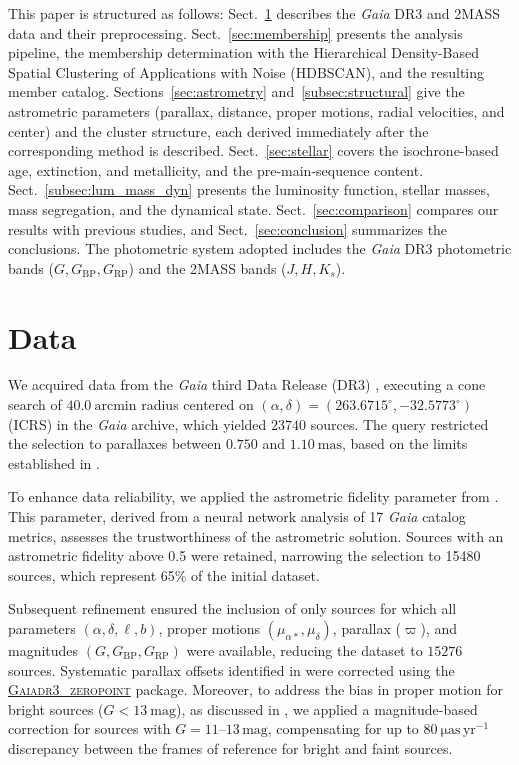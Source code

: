 \documentclass{aa}
\begin{document}
This paper is structured as follows: Sect.~\ref{sec:data} describes the \textit{Gaia} DR3 and 2MASS data and their preprocessing. Sect.~\ref{sec:membership} presents the analysis pipeline, the membership determination with the Hierarchical Density-Based Spatial Clustering of Applications with Noise (HDBSCAN), and the resulting member catalog. Sections~\ref{sec:astrometry} and~\ref{subsec:structural} give the astrometric parameters (parallax, distance, proper motions, radial velocities, and center) and the cluster structure, each derived immediately after the corresponding method is described. Sect.~\ref{sec:stellar} covers the isochrone-based age, extinction, and metallicity, and the pre-main-sequence content. Sect.~\ref{subsec:lum_mass_dyn} presents the luminosity function, stellar masses, mass segregation, and the dynamical state. Sect.~\ref{sec:comparison} compares our results with previous studies, and Sect.~\ref{sec:conclusion} summarizes the conclusions. The photometric system adopted includes the \textit{Gaia} DR3 photometric bands ($G, G_{\text{BP}}, G_{\text{RP}}$) and the 2MASS bands ($J, H, K_s$).

\section{Data}\label{sec:data}
We acquired data from the \textit{Gaia} third Data Release (DR3) \citep{2016A&A...595A...1G,2023A&A...674A...1G}, executing a cone search of $40.0~\mathrm{arcmin}$ radius centered on $(\alpha,\delta)=(263.6715^{\circ},-32.5773^{\circ})$ (ICRS) in the \textit{Gaia} archive, which yielded $23740$ sources. The query restricted the selection to parallaxes between $0.750$ and $1.10~\mathrm{mas}$, based on the limits established in \citet{2024arXiv240301030P}.

To enhance data reliability, we applied the astrometric fidelity parameter from \citet{2022MNRAS.510.2597R}. This parameter, derived from a neural network analysis of 17 \textit{Gaia} catalog metrics, assesses the trustworthiness of the astrometric solution. Sources with an astrometric fidelity above 0.5 were retained, narrowing the selection to 15480 sources, which represent 65\% of the initial dataset.

Subsequent refinement ensured the inclusion of only sources for which all parameters $(\alpha,\delta,\ell,b)$, proper motions $(\mu_{\alpha*},\mu_\delta)$, parallax ($\varpi$), and magnitudes $(G, G_\mathrm{BP}, G_\mathrm{RP})$ were available, reducing the dataset to $15276$ sources. Systematic parallax offsets identified in \citet{2021A&A...649A...4L} were corrected using the \href{https://pypi.org/project/gaiadr3-zeropoint/}{\textsc{Gaiadr3\_zeropoint}} package. Moreover, to address the bias in proper motion for bright sources ($G<13~\mathrm{mag}$), as discussed in \citet{2021A&A...649A.124C}, we applied a magnitude-based correction for sources with $G = 11$--$13\,\mathrm{mag}$, compensating for up to $80~\mathrm{\mu as\,yr^{-1}}$ discrepancy between the frames of reference for bright and faint sources.
\end{document}
